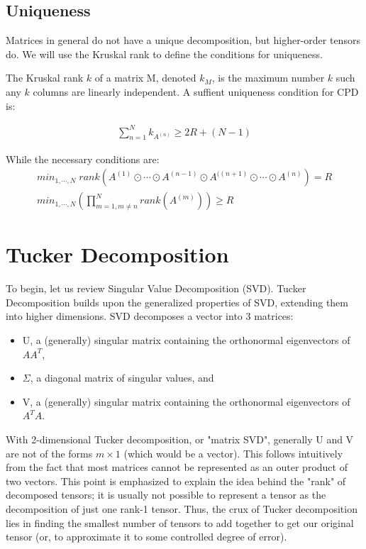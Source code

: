 \documentclass[11pt]{article}
\newcommand\0{\mathbf{0}}
\newcommand\<{\langle}
\renewcommand\>{\rangle}
\begin{document}
\subsection{Uniqueness}

Matrices in general do not have a unique decomposition, but higher-order tensors do. We will 
use the Kruskal rank to define the conditions for uniqueness.

The Kruskal rank $k$ of a matrix M, denoted $k_{M}$, is the maximum number $k$ such any $k$ columns are linearly independent. A suffient uniqueness condition for CPD is:

\begin{align*}  
    \sum_{n=1}^{N}k_{A^{(n)}}\geq 2R+(N-1)
\end{align*}

While the necessary conditions are:
\begin{align*}
    min_{1,\cdots,N}\; rank(A^{(1)} \odot \cdots \odot A^{(n-1)} \odot A^{((n+1)} \odot \cdots \odot A^{(n)})=R\\
    min_{1,\cdots, N}\left( \prod_{m=1,m\neq n}^{N}rank(A^{(m)})\right)\geq R
\end{align*}

\section{Tucker Decomposition}
    
To begin, let us review Singular Value Decomposition (SVD). Tucker Decomposition builds upon the generalized properties of SVD, extending them into higher dimensions. SVD decomposes a vector into 3 matrices: \begin{itemize}
    \item U, a (generally) singular matrix containing the orthonormal eigenvectors of $AA^T$,
    \item $\Sigma$, a diagonal matrix of singular values, and
    \item V, a (generally) singular matrix containing the orthonormal eigenvectors of $A^TA$.
\end{itemize}

With 2-dimensional Tucker decomposition, or "matrix SVD", generally U and V are not of the forms $m \times 1$ (which would be a vector). This follows intuitively from the fact that most matrices cannot be represented as an outer product of two vectors. This point is emphasized to explain the idea behind the "rank" of decomposed tensors; it is usually not possible to represent a tensor as the decomposition of just one rank-1 tensor. Thus, the crux of Tucker decomposition lies in finding the smallest number of tensors to add together to get our original tensor (or, to approximate it to some controlled degree of error). 
\end{document}
